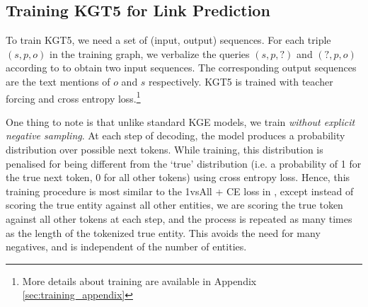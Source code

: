 \documentclass[11pt]{article}
\renewcommand\:{\colon} \newcommand{\sset}[1]{\left\{\,#1\,\right\}} \newcommand{\ssets}[1]{\left\{#1\right\}} \newcommand{\ssetn}[1]{\{\,#1\,\}}
\newcommand{\method}{\textsc{KGT5}}
\begin{document}
\subsection{Training \method{} for Link Prediction}
\label{sec:training}
To train KGT5, we need a set of (input, output) sequences. For each triple $(s,p,o)$ in the training graph, we verbalize the queries $(s,p,?)$ and $(?,p,o)$ according to  to obtain two input sequences. The corresponding output sequences are the text mentions of $o$ and $s$ respectively. KGT5 is trained with teacher forcing \cite{teacher_forcing} and cross entropy loss.\footnote{More details about training are available in Appendix \ref{sec:training_appendix}}

One thing to note is that unlike standard KGE models, we train \textit{without explicit negative sampling}. 
At each step of decoding, the model produces a probability distribution over possible next tokens. While training, this distribution is penalised for being different from the `true' distribution (i.e. a probability of 1 for the true next token, 0 for all other tokens) using cross entropy loss. Hence, this training procedure is most similar to the 1vsAll + CE loss in \citet{ruffinelli2020you}, except instead of scoring the true entity against all other entities, we are scoring the true token against all other tokens at each step, and the process is repeated as many times as the length of the tokenized true entity. This avoids the need for many negatives, and is independent of the number of entities.








\begin{table}[]
\centering
{}
\caption{Statistics of the KGs used.~$^{\dagger}$We use subsets of FreeBase~\cite{freebase:datadumps}  for WebQuestionsSP (WQSP) and ComplexWebQuestions (CWQ).
}
\label{tab:kg-stats}
\end{table} 
\end{document}
